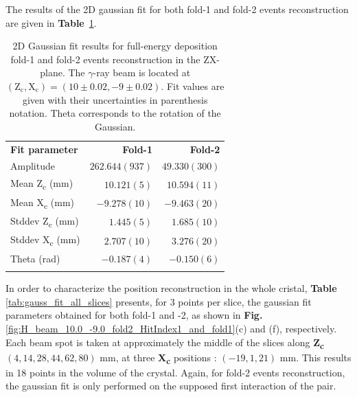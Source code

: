 The results of the 2D gaussian fit for both fold-1 and fold-2 events reconstruction are given in \textbf{Table}~\ref{tab:gaussian_fit_results_combined}.

\begin{table}[ht]
\centering
\caption{2D Gaussian fit results for full-energy deposition fold-1 and fold-2 events reconstruction in the ZX-plane. The $\gamma$-ray beam is located at $(\text{Z}_\text{c}, \text{X}_\text{c}) = (10\pm0.02, -9\pm0.02)$. Fit values are given with their uncertainties in parenthesis notation. Theta corresponds to the rotation of the Gaussian.}
\label{tab:gaussian_fit_results_combined}
\begin{tabular}{lrr}
\hline\noalign{\smallskip}
\textbf{Fit parameter} & \textbf{Fold-1} & \textbf{Fold-2} \\
\noalign{\smallskip}\hline\noalign{\smallskip}
Amplitude & $262.644(937)$ & $49.330(300)$ \\
Mean Z\textsubscript{c} (mm) & $10.121(5)$ & $10.594(11)$ \\
Mean X\textsubscript{c} (mm) & $-9.278(10)$ & $-9.463(20)$ \\
Stddev Z\textsubscript{c} (mm) & $1.445(5)$ & $1.685(10)$ \\
Stddev X\textsubscript{c} (mm) & $2.707(10)$ & $3.276(20)$ \\
Theta (rad) & $-0.187(4)$ & $-0.150(6)$ \\
\noalign{\smallskip}\hline
\end{tabular}
\end{table}

In order to characterize the position reconstruction in the whole cristal, \textbf{Table} \ref{tab:gauss_fit_all_slices} presents, for 3 points per slice, the gaussian fit parameters obtained for both fold-1 and -2, as shown in \textbf{Fig.} \ref{fig:H_beam_10.0_-9.0_fold2_HitIndex1_and_fold1}(c) and (f), respectively. Each beam spot is taken at approximately the middle of the slices along \textbf{Z\textsubscript{c}} $(4, 14, 28, 44, 62, 80)$ mm, at three \textbf{X\textsubscript{c}} positions : $(-19, 1, 21)$ mm. This results in 18 points in the volume of the crystal. Again, for fold-2 events reconstruction, the gaussian fit is only performed on the supposed first interaction of the pair.


